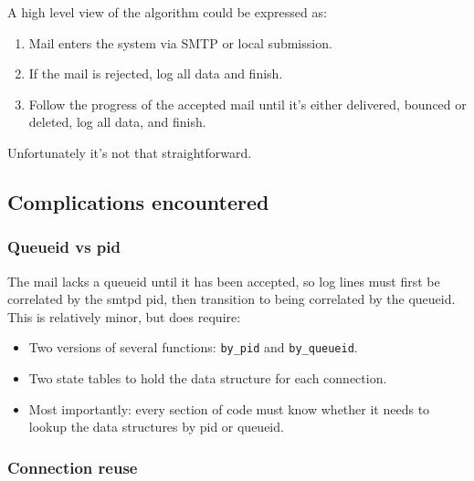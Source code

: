 \documentclass[a4paper,12pt,draft]{article}
\begin{document}
A high level view of the algorithm could be expressed as:

\begin{enumerate}

    \item Mail enters the system via SMTP or local submission.

    \item If the mail is rejected, log all data and finish.

    \item Follow the progress of the accepted mail until it's either
        delivered, bounced or deleted, log all data, and finish.

\end{enumerate}

Unfortunately it's not that straightforward.


\subsection{Complications encountered}

\label{complications}


\subsubsection{Queueid vs pid}

The mail lacks a queueid until it has been accepted, so log lines must
first be correlated by the smtpd pid, then transition to being correlated
by the queueid.  This is relatively minor, but does require:

\begin{itemize}

    \item Two versions of several functions: \texttt{by\_pid} and
        \texttt{by\_queueid}.

    \item Two state tables to hold the data structure for each connection.

    \item Most importantly: every section of code must know whether it
        needs to lookup the data structures by pid or queueid.

\end{itemize}

\subsubsection{Connection reuse}
\end{document}
